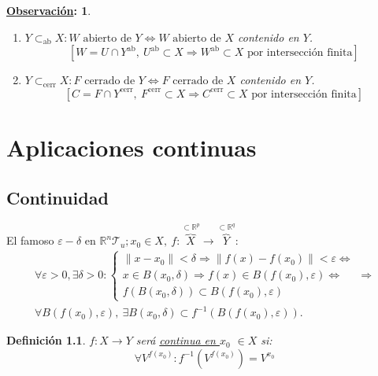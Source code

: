 \documentclass[10pt,a4paper,openright]{book}
\theoremstyle{break}
\newtheorem*{defi}{Definición}
\newtheorem*{obs}{\underline{Observación}:}
\begin{document}
\begin{obs}
\begin{enumerate}
    \item $Y \subset_{\text{ab}} X: W \text{ abierto de } Y \Leftrightarrow W \text{ abierto de } X$ contenido en $Y$.
    \[
    \left[ W = U \cap Y^{\text{ab}},\ U^{\text{ab}} \subset X \Rightarrow W^{\text{ab}} \subset X \text{ por intersección finita} \right] 
    \]
    \item $Y \subset_{\text{cerr}} X: F \text{ cerrado de } Y \Leftrightarrow F \text{ cerrado de } X$ contenido en $Y$.
    \[
    \left[ C = F \cap Y^{\text{cerr}},\ F^{\text{cerr}} \subset X \Rightarrow C^{\text{cerr}} \subset X \text{ por intersección finita} \right] 
    \]
\end{enumerate}
\end{obs}

\chapter{Aplicaciones continuas}%
\label{cha:aplicaciones_continuas}
\section{Continuidad}%
\label{sec:continuidad}
El famoso $\varepsilon-\delta$ en $\mathbb{R}^n \mathcal{T}_u; x_0 \in X,\ f : \overbrace{X}^{\subset \mathbb{R}^p} \rightarrow \overbrace{Y}^{\subset \mathbb{R}^q}$: 
\begin{gather*}        
\forall \varepsilon > 0, \exists \delta > 0: 
\begin{cases}
    \lVert x - x_0 \rVert < \delta \Rightarrow \lVert f\left( x \right) - f\left( x_0 \right) \rVert < \varepsilon \Leftrightarrow\\
    x \in B\left( x_0, \delta \right) \Rightarrow f\left( x \right) \in B\left( f\left( x_0 \right), \varepsilon \right) \Leftrightarrow\\
    f\left( B\left( x_0, \delta \right) \right) \subset B\left( f\left( x_0 \right), \varepsilon \right) 
\end{cases} \Rightarrow\\
\boxed{\forall B\left( f\left( x_0 \right), \varepsilon \right),\ \exists B\left( x_0, \delta \right) \subset f^{-1}\left( B\left( f\left( x_0 \right), \varepsilon \right) \right)} 
.\end{gather*}

\begin{defi}
$f: X \rightarrow Y$ será \underline{continua en $x_0$} $\in X$ si: 
\[
\forall V^{f\left( x_0 \right)}: f^{-1}\left( V^{f\left( x_0 \right)} \right) = V^{x_0} 
\]
\end{defi}
\end{document}
